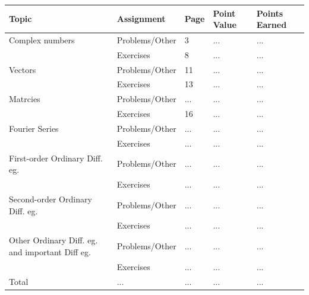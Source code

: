 \documentclass[fleqn]{article}
\begin{document}
\begin{singlespace}
  \begin{tabular}{ |p{3cm}|||p{4cm}|p{2cm}|p{2cm}|p{2cm}|  }
      \hline
      Topic & Assignment & Page & Point Value & Points Earned \\
      \hline
      Complex numbers & \cellcolor{orange} Problems/Other & \cellcolor{orange} 3 &\cellcolor{orange}  ... &\cellcolor{orange}  ... \\
      & \cellcolor{orange} Exercises &\cellcolor{orange}  8 &\cellcolor{orange}  ... &\cellcolor{orange}  ... \\
      \hline
      Vectors & Problems/Other & 11 & ... & ... \\
      & Exercises & 13 & ... & ... \\
      \hline
      Matrcies & \cellcolor{orange} Problems/Other &\cellcolor{orange}  ... &\cellcolor{orange}  ... & \cellcolor{orange} ... \\
      & \cellcolor{orange} Exercises &\cellcolor{orange}  16 &\cellcolor{orange}  ... &\cellcolor{orange}  ... \\
      \hline
      Fourier Series & Problems/Other & ... & ... & ... \\
      & Exercises & ... & ... & ... \\
      \hline
      First-order Ordinary Diff. eg.  &\cellcolor{orange} Problems/Other &\cellcolor{orange} ... &\cellcolor{orange} ... &\cellcolor{orange} ... \\
      & \cellcolor{orange} Exercises &\cellcolor{orange}  ... &\cellcolor{orange}  ... &\cellcolor{orange}  ... \\
      \hline
      Second-order Ordinary Diff. eg. & Problems/Other & ...  & ... & ... \\
      & Exercises & ... & ... & ... \\
      \hline
      Other Ordinary Diff. eg. and important Diff eg. &\cellcolor{orange} Problems/Other &\cellcolor{orange} ... & \cellcolor{orange}... & \cellcolor{orange}...  \\ 
      & \cellcolor{orange} Exercises &\cellcolor{orange}  ... &\cellcolor{orange}  ... &\cellcolor{orange}  ... \\ 
      \hline
      Total & ... & ... & ... & ... \\
      \hline
  \end{tabular}
\end{singlespace}

\pagebreak
\end{document}
